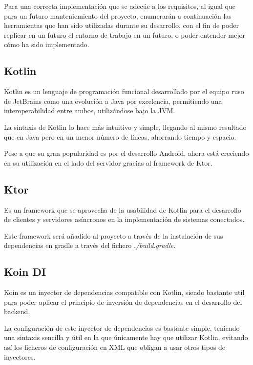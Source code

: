 Para una correcta implementación que se adecúe a los requisitos, al igual que para un futuro manteniemiento del proyecto, enumerarán a continuación las herramientas que han sido utilizadas durante su desarrollo, con el fin de poder replicar en un futuro el entorno de trabajo en un futuro, o poder entender mejor cómo ha sido implementado.

    \subsection{Kotlin}

Kotlin es un lenguaje de programación funcional desarrollado por el equipo ruso de JetBrains como una evolución a Java por excelencia, permitiendo una interoperabilidad entre ambos, utilizándose bajo la JVM.

La sintaxis de Kotlin lo hace más intuitivo y simple, llegando al mismo resultado que en Java pero en un menor número de líneas, ahorrando tiempo y espacio.

Pese a que su gran popularidad es por el desarrollo Android, ahora está creciendo en su utilización en el lado del servidor gracias al framework de Ktor.~\cite{ktor}

    \subsection{Ktor}

Es un framework que se aprovecha de la usabilidad de Kotlin para el desarrollo de clientes y servidores asíncronos en la implementación de sistemas conectados.

Este framework será añadido al proyecto a través de la instalación de sus dependencias en gradle a través del fichero \textit{./build.gradle}.

    \subsection{Koin DI}
    \label{Koin}

Koin es un inyector de dependencias compatible con Kotlin, siendo bastante util para poder aplicar el principio de inversión de dependencias en el desarrollo del backend.~\cite{koin}

La configuración de este inyector de dependencias es bastante simple, teniendo una sintaxis sencilla y útil en la que únicamente hay que utilizar Kotlin, evitando así los ficheros de configuración en XML que obligan a usar otros tipos de inyectores.

